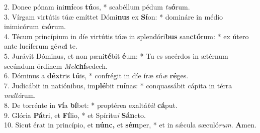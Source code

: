 2. Donec pónam ini\textbf{mí}cos \textbf{tú}os, * scabéllum pédum \textit{tu}\textbf{ó}rum.\\
3. Vírgam virtútis túæ emíttet Dómi\textbf{nus} ex \textbf{Sí}on: * domináre in médio inimicórum \textit{tu}\textbf{ó}rum.\\
4. Técum princípium in díe virtútis túæ in splendóri\textbf{bus} san\textbf{ctó}rum: * ex útero ante lucíferum gé\textit{nu}\textbf{i} te.\\
5. Jurávit Dóminus, et non pæni\textbf{té}bit \textbf{é}um: * Tu es sacérdos in ætérnum secúndum órdinem \textit{Mel}\textbf{chí}sedech.\\
6.  Dóminus a \textbf{déx}tris \textbf{tú}is, * confrégit in díe íræ sú\textit{æ} \textbf{ré}ges.\\
7. Judicábit in natiónibus, im\textbf{plé}bit ru\textbf{í}nas: * conquassábit cápita in térra \textit{mul}\textit{tó}rum.\\
8. De torrénte in \textbf{ví}a \textbf{bí}bet: * proptérea exaltá\textit{bit} \textbf{cá}put.\\
9. Glória \textbf{Pá}tri, et \textbf{Fí}lio, * et Spírítu\textit{i} \textbf{Sán}cto.\\
10. Sicut érat in princípio, et \textbf{núnc,} et \textbf{sém}per, * et in sǽcula sæculó\textit{rum}. \textbf{A}men.